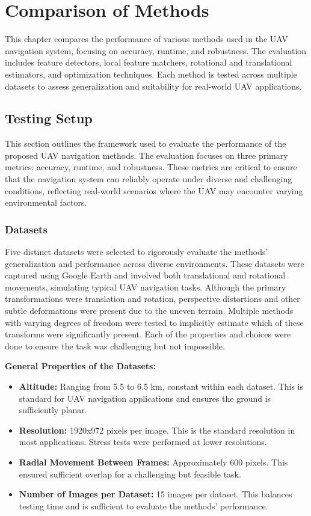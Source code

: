 \chapter{Comparison of Methods}

This chapter compares the performance of various methods used in the UAV navigation system, focusing on accuracy, runtime, and robustness. The evaluation includes feature detectors, local feature matchers, rotational and translational estimators, and optimization techniques. Each method is tested across multiple datasets to assess generalization and suitability for real-world UAV applications.

\section{Testing Setup}

This section outlines the framework used to evaluate the performance of the proposed UAV navigation methods. The evaluation focuses on three primary metrics: accuracy, runtime, and robustness. These metrics are critical to ensure that the navigation system can reliably operate under diverse and challenging conditions, reflecting real-world scenarios where the UAV may encounter varying environmental factors.

\subsection{Datasets}

Five distinct datasets were selected to rigorously evaluate the methods' generalization and performance across diverse environments. These datasets were captured using Google Earth and involved both translational and rotational movements, simulating typical UAV navigation tasks. Although the primary transformations were translation and rotation, perspective distortions and other subtle deformations were present due to the uneven terrain. Multiple methods with varying degrees of freedom were tested to implicitly estimate which of these transforms were significantly present. Each of the properties and choices were done to ensure the task was challenging but not impossible.

\textbf{General Properties of the Datasets:}
\begin{itemize}
    \item \textbf{Altitude:} Ranging from 5.5 to 6.5 km, constant within each dataset. This is standard for UAV navigation applications and ensures the ground is sufficiently planar.
    \item \textbf{Resolution:} 1920x972 pixels per image. This is the standard resolution in most applications. Stress tests were performed at lower resolutions.
    \item \textbf{Radial Movement Between Frames:} Approximately 600 pixels. This ensured sufficient overlap for a challenging but feasible task.
    \item \textbf{Number of Images per Dataset:} 15 images per dataset. This balances testing time and is sufficient to evaluate the methods' performance. 
\end{itemize}

